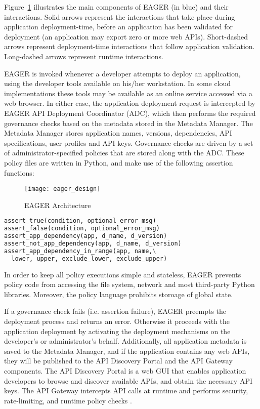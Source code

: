Figure~\ref{fig:eager_design} illustrates the main components of EAGER (in
blue) and their interactions. Solid arrows represent the interactions that take place
during application deployment-time, before an application has been validated
for deployment (an application may export zero or more web APIs). 
Short-dashed arrows represent deployment-time interactions that follow application validation.
Long-dashed arrows represent runtime interactions.

EAGER is invoked whenever a developer attempts to deploy an application, using
the developer tools available on his/her workstation. In some cloud
implementations these tools may be available as an online service accessed
via a web browser. In either case, the application deployment request is
intercepted by EAGER API Deployment Coordinator (ADC), which then performs the 
required governance checks based on the metadata stored in the Metadata Manager.
The Metadata Manager stores application names, versions, dependencies, API specifications,
user profiles and API keys.
Governance checks are driven by a set of administrator-specified policies that
are stored along with the ADC. These policy files are written in Python, and make use of 
the following assertion functions:

\begin{figure}
\centering
\texttt{[image: eager\_design]}
\caption{EAGER Architecture}
\label{fig:eager_design}
\end{figure}

{\footnotesize 
\begin{lstlisting}[language=Python, frame=single]
assert_true(condition, optional_error_msg)
assert_false(condition, optional_error_msg)
assert_app_dependency(app, d_name, d_version)
assert_not_app_dependency(app, d_name, d_version)
assert_app_dependency_in_range(app, name,\
  lower, upper, exclude_lower, exclude_upper)
\end{lstlisting}
}

In order to keep all policy executions simple and stateless, EAGER prevents
policy code from accessing the file system, network and most third-party Python
libraries. Moreover, the policy language prohibits storoage of global state.

If a governance check fails (i.e. assertion failure), EAGER preempts the 
deployment process and returns an error. Otherwise it proceeds with the application deployment by
activating the deployment mechanisms on the developer's or administrator's
behalf. Additionally, all application metadata is saved to the Metadata Manager, and
if the application contains any web APIs, they will be published to the API Discovery Portal
and the API Gateway components. The API Discovery Portal is a web GUI that enables 
application developers to browse and
discover available APIs, and obtain the necessary API keys. The API Gateway intercepts
API calls at runtime and performs security, rate-limiting, and runtime policy checks . %

